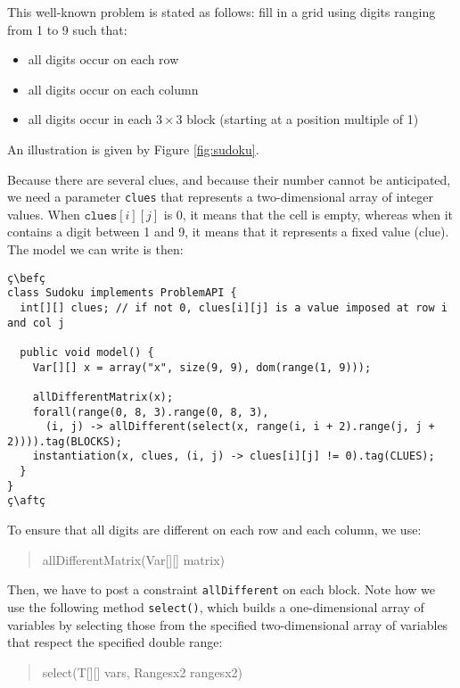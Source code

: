\documentclass[10pt]{article}
\newcommand{\gb}[1]{{\tt #1}} %
\newcommand{\nn}[1]{{\tt #1}} %
\newenvironment{myvb}{\endgraf\small\verbatim}{\endverbatim}
\def\bef{\rule{10cm}{0.1mm}} %
\def\aft{\rule{10cm}{0.1mm}\medskip}
\begin{document}
This well-known problem is stated as follows: fill in a grid using digits ranging from 1 to 9 such that:
\begin{itemize}
\item all digits occur on each row
\item all digits occur on each column
  \item all digits occur in each $3 \times 3$ block (starting at a position multiple of 1) 
\end{itemize}
An illustration is given by Figure \ref{fig:sudoku}.

Because there are several clues, and because their number cannot be anticipated, we need a parameter \texttt{clues} that represents a two-dimensional array of integer values.
When $\texttt{clues}[i][j]$ is 0, it means that the cell is empty, whereas when it contains a digit between 1 and 9, it means that it represents a fixed value (clue).
The model we can write is then:


\begin{lstlisting}
ç\befç
class Sudoku implements ProblemAPI {
  int[][] clues; // if not 0, clues[i][j] is a value imposed at row i and col j

  public void model() {
    Var[][] x = array("x", size(9, 9), dom(range(1, 9)));

    allDifferentMatrix(x);
    forall(range(0, 8, 3).range(0, 8, 3),
      (i, j) -> allDifferent(select(x, range(i, i + 2).range(j, j + 2)))).tag(BLOCKS);
    instantiation(x, clues, (i, j) -> clues[i][j] != 0).tag(CLUES);
  }
}
ç\aftç
\end{lstlisting}

To ensure that all digits are different on each row and each column, we use:

\begin{quote}
\begin{myvb}
allDifferentMatrix(Var[][] matrix) 
\end{myvb}
\end{quote}

Then, we have to post a constraint \gb{allDifferent} on each block.
Note how we use the following method \nn{select()}, which builds a one-dimensional array of variables by selecting those from the specified two-dimensional array of variables that respect the specified double range:

\begin{quote}
\begin{myvb}
select(T[][] vars, Rangesx2 rangesx2) 
\end{myvb}
\end{quote}
\end{document}
